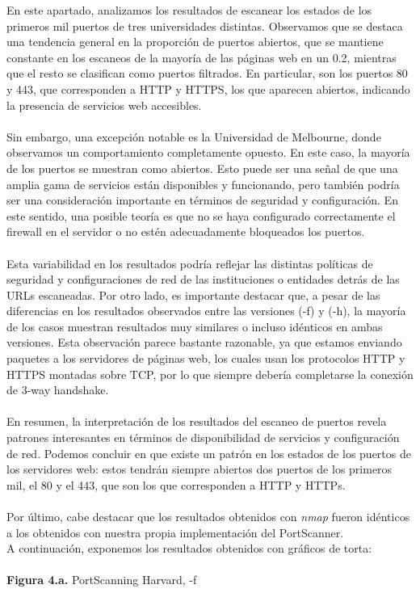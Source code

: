 \documentclass{article}
\begin{document}
En este apartado, analizamos los resultados de escanear los estados de los primeros mil puertos de tres universidades distintas. Observamos que se destaca una tendencia general en la proporción de puertos abiertos, que se mantiene constante en los escaneos de la mayoría de las páginas web en un 0.2, mientras que el resto se clasifican como puertos filtrados. En particular, son los puertos 80 y 443, que corresponden a HTTP y HTTPS, los que aparecen abiertos, indicando la presencia de servicios web accesibles.\\
\\
Sin embargo, una excepción notable es la Universidad de Melbourne, donde observamos un comportamiento completamente opuesto. En este caso, la mayoría de los puertos se muestran como abiertos. Esto puede ser una señal de que una amplia gama de servicios están disponibles y funcionando, pero también podría ser una consideración importante en términos de seguridad y configuración. En este sentido, una posible teoría es que no se haya configurado correctamente el firewall en el servidor o no estén adecuadamente bloqueados los puertos. \\
\\
Esta variabilidad en los resultados podría reflejar las distintas políticas de seguridad y configuraciones de red de las instituciones o entidades detrás de las URLs escaneadas. Por otro lado, es importante destacar que, a pesar de las diferencias en los resultados observados entre las versiones (-f) y (-h), la mayoría de los casos muestran resultados muy similares o incluso idénticos en ambas versiones. Esta observación parece bastante razonable, ya que estamos enviando paquetes a los servidores de páginas web, los cuales usan los protocolos HTTP y HTTPS montadas sobre TCP, por lo que siempre debería completarse la conexión de 3-way handshake.\\
\\
En resumen, la interpretación de los resultados del escaneo de puertos revela patrones interesantes en términos de disponibilidad de servicios y configuración de red. Podemos concluir en que existe un patrón en los estados de los puertos de los servidores web: estos tendrán siempre abiertos dos puertos de los primeros mil, el 80 y el 443, que son los que corresponden a HTTP y HTTPs.  \\
\\
Por último, cabe destacar que los resultados obtenidos con \textit{nmap} fueron idénticos a los obtenidos con nuestra propia implementación del PortScanner.
\\
\vspace{0.5cm}
A continuación, exponemos los resultados obtenidos con gráficos de torta:\\
\pagebreak
\\
\textbf{Figura 4.a.} PortScanning Harvard, -f
\\
\end{document}

